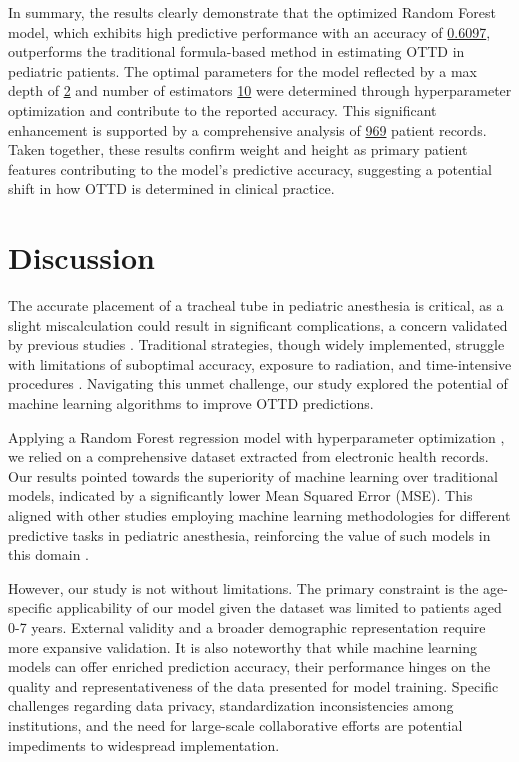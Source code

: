 \documentclass[11pt]{article}
\begin{document}
In summary, the results clearly demonstrate that the optimized Random Forest model, which exhibits high predictive performance with an accuracy of \hyperlink{R2a}{0.6097}, outperforms the traditional formula-based method in estimating OTTD in pediatric patients. The optimal parameters for the model reflected by a max depth of \hyperlink{R1a}{2} and number of estimators \hyperlink{R1b}{10} were determined through hyperparameter optimization and contribute to the reported accuracy. This significant enhancement is supported by a comprehensive analysis of \hyperlink{R0a}{969} patient records. Taken together, these results confirm weight and height as primary patient features contributing to the model’s predictive accuracy, suggesting a potential shift in how OTTD is determined in clinical practice.

\section*{Discussion}

The accurate placement of a tracheal tube in pediatric anesthesia is critical, as a slight miscalculation could result in significant complications, a concern validated by previous studies \cite{Matava2020PediatricAM, Ahmad2019DifficultAS}. Traditional strategies, though widely implemented, struggle with limitations of suboptimal accuracy, exposure to radiation, and time-intensive procedures \cite{Fedor2017NoninvasiveRS, Auchincloss2016ComplicationsAT, Kendirli2006MechanicalVI, Bonafide2015AssociationBE}. Navigating this unmet challenge, our study explored the potential of machine learning algorithms to improve OTTD predictions.

Applying a Random Forest regression model with hyperparameter optimization \cite{Wu2019HyperparameterOF, Rauber2017FoolboxAP}, we relied on a comprehensive dataset extracted from electronic health records. Our results pointed towards the superiority of machine learning over traditional models, indicated by a significantly lower Mean Squared Error (MSE). This aligned with other studies employing machine learning methodologies for different predictive tasks in pediatric anesthesia, reinforcing the value of such models in this domain \cite{Roberts2020CommonPA, Yi2018AutomaticCA, Wei2020AccuracyIO}.

However, our study is not without limitations. The primary constraint is the age-specific applicability of our model given the dataset was limited to patients aged 0-7 years. External validity and a broader demographic representation require more expansive validation. It is also noteworthy that while machine learning models can offer enriched prediction accuracy, their performance hinges on the quality and representativeness of the data presented for model training. Specific challenges regarding data privacy, standardization inconsistencies among institutions, and the need for large-scale collaborative efforts are potential impediments to widespread implementation.
\end{document}
